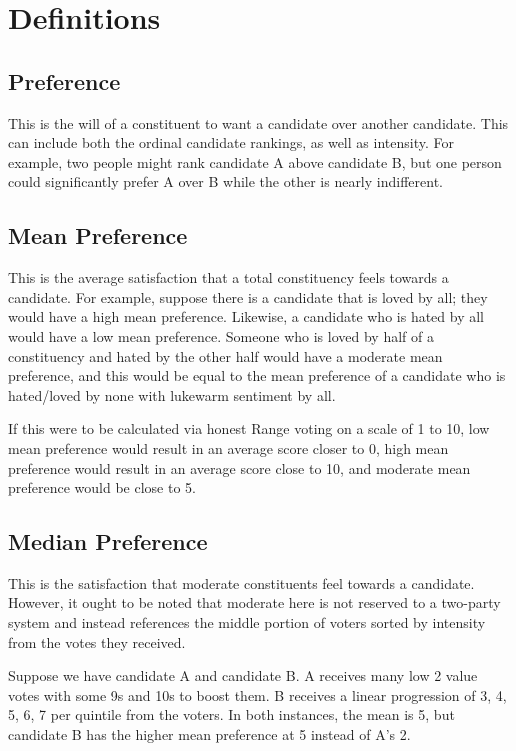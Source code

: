 \chapter{Definitions}
\label{AppendixA}

\section{Preference}
This is the will of a constituent to want a candidate over another candidate. This can include both the ordinal candidate rankings, as well as intensity. For example, two people might rank candidate A above candidate B, but one person could significantly prefer A over B while the other is nearly indifferent.

\section{Mean Preference}
This is the average satisfaction that a total constituency feels towards a candidate. For example, suppose there is a candidate that is loved by all; they would have a high mean preference. Likewise, a candidate who is hated by all would have a low mean preference. Someone who is loved by half of a constituency and hated by the other half would have a moderate mean preference, and this would be equal to the mean preference of a candidate who is hated/loved by none with lukewarm sentiment by all.

If this were to be calculated via honest Range voting on a scale of 1 to 10, low mean preference would result in an average score closer to 0, high mean preference would result in an average score close to 10, and moderate mean preference would be close to 5.

\section{Median Preference}
This is the satisfaction that moderate constituents feel towards a candidate. However, it ought to be noted that moderate here is not reserved to a two-party system and instead references the middle portion of voters sorted by intensity from the votes they received.

Suppose we have candidate A and candidate B. A receives many low 2 value votes with some 9s and 10s to boost them. B receives a linear progression of 3, 4, 5, 6, 7 per quintile from the voters. In both instances, the mean is 5, but candidate B has the higher mean preference at 5 instead of A’s 2.
